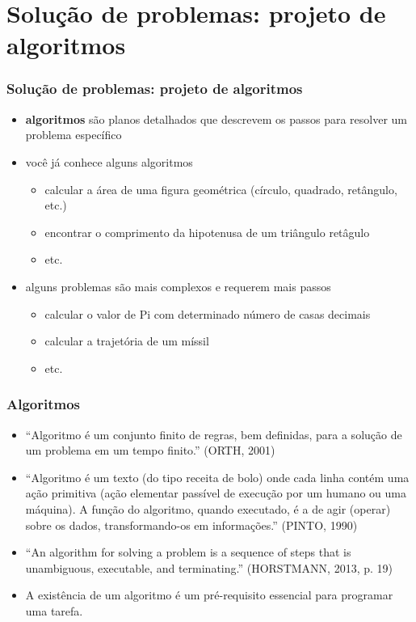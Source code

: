 \documentclass[aspectratio=169]{beamer}
\begin{document}
\section{Solução de problemas: projeto de algoritmos}

\begin{frame}\frametitle{Solução de problemas: projeto de algoritmos}
\begin{itemize}
	\item \textbf{algoritmos} são planos detalhados que descrevem os passos para resolver um problema específico
	\item você já conhece alguns algoritmos
	\begin{itemize}
		\item calcular a área de uma figura geométrica (círculo, quadrado, retângulo, etc.)
		\item encontrar o comprimento da hipotenusa de um triângulo retâgulo
		\item etc.
	\end{itemize}
	\item alguns problemas são mais complexos e requerem mais passos
	\begin{itemize}
		\item calcular o valor de Pi com determinado número de casas decimais
		\item calcular a trajetória de um míssil
		\item etc.
	\end{itemize}
\end{itemize}
\end{frame}

\begin{frame}\frametitle{Algoritmos}
\begin{itemize}
\item ``Algoritmo é um conjunto finito de regras, bem definidas, para a solução de um problema em um tempo finito.'' (ORTH, 2001)
\item ``Algoritmo é um texto (do tipo receita de bolo) onde cada linha contém uma ação primitiva (ação elementar passível de execução por um humano ou uma máquina). A função do algoritmo, quando executado, é a de agir (operar) sobre os dados, transformando-os em informações.'' (PINTO, 1990)
\item ``An algorithm for solving a problem is a sequence of steps that is unambiguous, executable, and terminating.'' (HORSTMANN, 2013, p. 19)
\item A existência de um algoritmo é um pré-requisito essencial para programar uma tarefa.
\end{itemize}
\end{frame}
\end{document}
